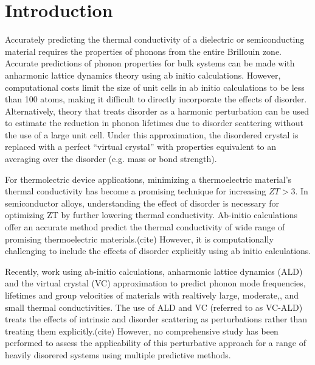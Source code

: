 \documentclass[aps,prb,twocolumn,superscriptaddress,preprintnumbers,amsmath,amssymb,floatfix]{revtex4}
\begin{document}
\section{\label{S:Intro}Introduction}

Accurately predicting the thermal conductivity of a dielectric or 
semiconducting material requires the properties of phonons from the entire 
Brillouin zone. Accurate predictions of phonon properties for bulk systems 
can be made with anharmonic lattice dynamics theory using ab initio 
calculations. However, computational costs limit the size of unit cells 
in ab initio calculations to be less than 100 atoms, making it difficult 
to directly incorporate the effects of disorder. Alternatively, theory 
that treats disorder as a harmonic perturbation can be used to estimate 
the reduction in phonon lifetimes due to disorder scattering without 
the use of a large unit cell. Under this approximation, the disordered 
crystal is replaced with a perfect “virtual crystal” with properties 
equivalent to an averaging over the disorder (e.g.  mass or bond 
strength). 

For thermolectric device applications, minimizing a thermoelectric 
material's thermal 
conductivity has become a promising technique for increasing $ZT>3$.
\cite{chen_recent_2003,dresselhaus_new_2007} In semiconductor alloys, 
understanding the effect of disorder is necessary for optimizing 
ZT by further lowering thermal conductivity.
\cite{he_thermoelectric_2006,huang_filler-reduced_2010,
toberer_phonon_2011}  Ab-initio calculations offer an accurate 
method predict the thermal conductivity of wide range of promising 
thermoelectric materials.(cite) However, it is computationally challenging 
to include the effects of disorder explicitly using ab initio calculations. 

Recently, work using ab-initio calculations, anharmonic 
lattice dynamics (ALD) and the virtual crystal (VC) 
approximation to predict phonon mode frequencies, lifetimes and 
group velocities of materials with realtively
large,\cite{garg_role_2011,lindsay_thermal_2012} 
moderate,\cite{thermal_shiomi_2011}, and 
small \cite{tian_phonon_2012} 
thermal conductivities. The use of ALD and VC (referred to as VC-ALD) 
treats the effects of intrinsic and disorder scattering as perturbations 
rather than treating them explicitly.(cite)
However, no comprehensive study has been performed 
to assess the applicability of this perturbative approach for a range 
of heavily disorered systems using multiple predictive methods.
\end{document}
